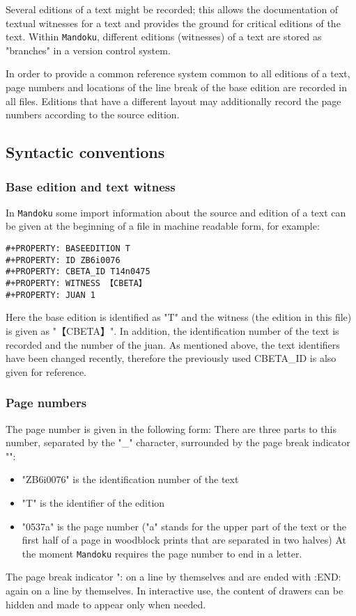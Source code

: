 \documentclass[11pt]{article}
\begin{document}
Several editions of a text might be recorded; this allows the
documentation of textual witnesses for a text and provides the
ground for critical editions of the text. Within \texttt{Mandoku},
different editions (witnesses) of a text are stored as "branches"
in a version control system.

In order to provide a common reference system common to all
editions of a text, page numbers and locations of the line break of
the base edition are recorded in all files. Editions that have a
different layout may additionally record the page numbers according
to the source edition.

\subsection{Syntactic conventions}
\label{sec-2-3}

\subsubsection{Base edition and text witness}
\label{sec-2-3-1}
In \texttt{Mandoku} some import information about the source and
edition of a text can be given at the beginning of a file in machine
readable form, for example:

\begin{verbatim}
#+PROPERTY: BASEEDITION T
#+PROPERTY: ID ZB6i0076
#+PROPERTY: CBETA_ID T14n0475
#+PROPERTY: WITNESS 【CBETA】
#+PROPERTY: JUAN 1
\end{verbatim}

Here the base edition is identified as "T" and the witness (the
edition in this file) is given as "【CBETA】".  In addition, the
identification number of the text is recorded and the number of the
juan. As mentioned above, the text identifiers have been changed
recently, therefore the previously used CBETA\_ID is also given for
reference.
\subsubsection{Page numbers}
\label{sec-2-3-2}
The page number is given in the following form:
There are three parts to this number, separated by the "\_"
character, surrounded by the page break indicator "":
\begin{itemize}
\item "ZB6i0076" is the identification number of the text
\item "T" is the identifier of the edition
\item "0537a" is the page number ("a" stands for the upper part of the
text or the first half of a page in woodblock prints that are
separated in two halves) At the moment \texttt{Mandoku} requires the page
number to end in a letter.
\end{itemize}

The page break indicator ": on a line by themselves and are ended with :END: again on
  a line by themselves. In interactive use, the content of drawers
  can be hidden and made to appear only when needed.
\end{document}
